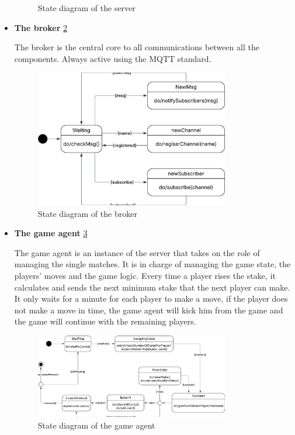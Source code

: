 \documentclass{scrartcl}
\begin{document}
\begin{itemize}
\begin{figure}[H]
                  \caption{State diagram of the server}
                  \label{fig:serverStates}
            \end{figure}
      \item
            \textbf{The broker} \cref{fig:brokerStates} \par
            The broker is the central core to all communications between all the components.
            Always active using the MQTT standard.
            \begin{figure}[H]
                  \centering
                  \includegraphics[width=0.8\textwidth]{figures/brokerStates.png}
                  \caption{State diagram of the broker}
                  \label{fig:brokerStates}
            \end{figure}
      \item
            \textbf{The game agent} \cref{fig:gameAgentStates} \par
            The game agent is an instance of the server that takes on the role of managing the single matches.
            It is in charge of managing the game state, the players' moves and the game logic. \newline
            Every time a player rises the stake, it calculates and sends the next minimum stake that the
            next player can make.
            It only waits for a minute for each player to make a move, if the player does not make a move
            in time, the game agent will kick him from the game and the game will continue with the remaining players.
            \begin{figure}[H]
                  \centering
                  \includegraphics[width=0.8\textwidth]{figures/gameAgentStates.png}
                  \caption{State diagram of the game agent}
                  \label{fig:gameAgentStates}
            \end{figure}
\end{itemize}
\end{document}
